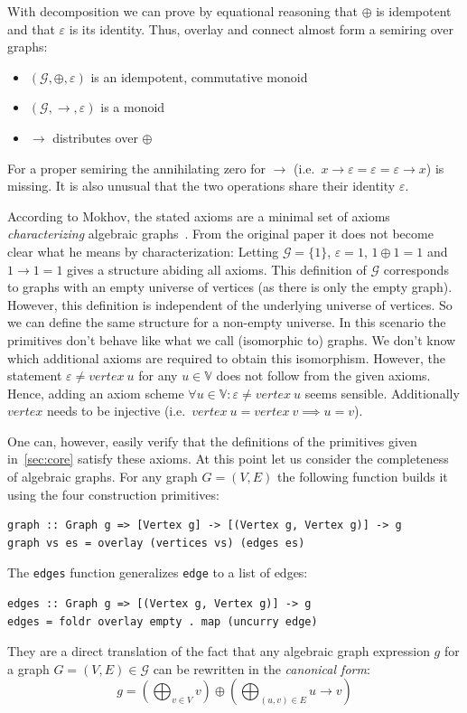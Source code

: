 \documentclass{article}
\newcommand{\hs}{\texttt}
\renewcommand{\epsilon}{\varepsilon}
\newcommand{\eps}{\epsilon}
\newcommand{\overlay}{\oplus}
\newcommand{\connect}{\rightarrow}
\begin{document}
With decomposition we can prove by equational reasoning that $\overlay$ is
idempotent and that $\eps$ is its identity. Thus, overlay and connect
almost form a semiring over graphs:
\begin{itemize}
\item $(\mathcal{G}, \overlay, \eps)$ is an idempotent, commutative monoid
\item $(\mathcal{G}, \connect, \eps)$ is a monoid
\item $\connect$ distributes over $\overlay$
\end{itemize}
For a proper semiring the annihilating zero for $\connect$ (i.e.\
$x \connect \eps = \eps = \eps \connect x$) is missing. It is also unusual that the two operations
share their identity $\eps$.

According to Mokhov, the stated axioms are a minimal set of axioms
\emph{characterizing} algebraic graphs~\cite{mokhov2017algebraic}. From the
original paper it does not become clear what he means by characterization:
Letting $\mathcal{G} = \{1\}$, $\eps = 1$, $1 \overlay 1 = 1$ and
$1\connect 1 = 1$ gives a structure abiding all axioms. This definition of
$\mathcal{G}$ corresponds to graphs with an empty universe of vertices (as there
is only the empty graph). However, this definition is independent of the
underlying universe of vertices. So we can define the same structure
for a non-empty universe. In this scenario the primitives don't behave like what we
call (isomorphic to) graphs.
We don't know which additional axioms are required to obtain this isomorphism.
However, the statement $\eps \neq vertex\ u$ for any $u \in \mathbb{V}$ does not
follow from the given axioms. Hence, adding an axiom scheme $\forall u \in
\mathbb{V}: \eps \neq vertex\ u$ seems sensible. Additionally $vertex$ 
needs to be injective (i.e.\ $vertex\ u = vertex\ v \implies u = v$).

One can, however, easily verify that the definitions of the primitives given
in~\autoref{sec:core} satisfy these axioms. At this point let us consider the
completeness of algebraic graphs. For any graph $G=(V,E)$ the following function
builds it using the four construction primitives:
\begin{verbatim}
graph :: Graph g => [Vertex g] -> [(Vertex g, Vertex g)] -> g
graph vs es = overlay (vertices vs) (edges es)
\end{verbatim}
The \hs{edges} function generalizes \hs{edge} to a list of edges:
\begin{verbatim}
edges :: Graph g => [(Vertex g, Vertex g)] -> g
edges = foldr overlay empty . map (uncurry edge)
\end{verbatim}
They are a direct translation of the fact that any algebraic graph expression
$g$ for a graph $G=(V,E) \in \mathcal{G}$ can be rewritten in the 
\textit{canonical form}:
\[
  g = \left( \bigoplus_{v \in V} v \right) \oplus \left( \bigoplus_{(u,v) \in E}
    u \connect v \right)
\]
\end{document}
